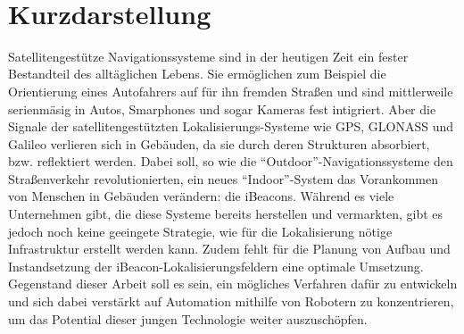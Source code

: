 \maketitle 
\newpage\thispagestyle{empty}~
\newpage
\setcounter{tocdepth}{2}

\section*{Kurzdarstellung}
Satellitengestütze Navigationssysteme sind in der heutigen Zeit ein fester Bestandteil des alltäglichen Lebens. Sie ermöglichen zum Beispiel die Orientierung eines Autofahrers auf für ihn fremden Straßen und sind mittlerweile serienmäsig in Autos, Smarphones und sogar Kameras fest intigriert. Aber die Signale der satellitengestützten Lokalisierungs-Systeme wie GPS, GLONASS und Galileo verlieren sich in Gebäuden, da sie durch deren Strukturen absorbiert, bzw. reflektiert werden. Dabei soll, so wie die "`Outdoor"'-Navigationssysteme den Straßenverkehr revolutionierten, ein neues "`Indoor"'-System das Vorankommen von Menschen in Gebäuden verändern: die iBeacons. Während es viele Unternehmen gibt, die diese Systeme bereits herstellen und vermarkten, gibt es jedoch noch keine geeingete Strategie, wie für die Lokalisierung nötige Infrastruktur erstellt werden kann. Zudem fehlt für die Planung von Aufbau und Instandsetzung der iBeacon-Lokalisierungsfeldern eine optimale Umsetzung. Gegenstand dieser Arbeit soll es sein, ein mögliches Verfahren dafür zu entwickeln und sich dabei verstärkt auf Automation mithilfe von Robotern zu konzentrieren, um das Potential dieser jungen Technologie weiter auszuschöpfen.  